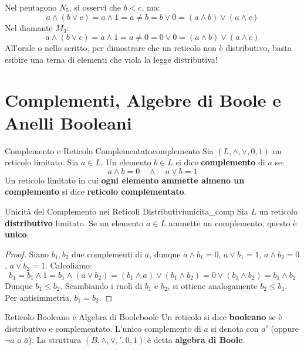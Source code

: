 \begin{avvisoCutolo}
    Nel pentagono $N_5$, si osservi che $b < c$, ma:
    \[
        a \wedge (b \vee c) = a \wedge 1 = a \neq b = b \vee 0 = (a \wedge b) \vee (a \wedge c)
    \]
    Nel diamante $M_3$:
    \[
        a \wedge (b \vee c) = a \wedge 1 = a \neq 0 = 0 \vee 0 = (a \wedge b) \vee (a \wedge c)
    \]
    All'orale o nello scritto, per dimostrare che un reticolo non è distributivo, basta esibire una terna di elementi che viola la legge distributiva!
\end{avvisoCutolo}

\section{Complementi, Algebre di Boole e Anelli Booleani}

\begin{definizione}{Complemento e Reticolo Complementato}{complemento}
Sia $(L, \wedge, \vee, 0, 1)$ un reticolo limitato. Sia $a \in L$. Un elemento $b \in L$ si dice \textbf{complemento} di $a$ se:
\[
    a \wedge b = 0 \quad \wedge \quad a \vee b = 1
\]
Un reticolo limitato in cui \textbf{ogni elemento ammette almeno un complemento} si dice \textbf{reticolo complementato}.
\end{definizione}

\begin{teorema}{Unicità del Complemento nei Reticoli Distributivi}{unicita_comp}
Sia $L$ un reticolo \textbf{distributivo} limitato. Se un elemento $a \in L$ ammette un complemento, questo è \textbf{unico}.
\end{teorema}
\begin{proof}
Siano $b_1, b_2$ due complementi di $a$, dunque $a \wedge b_1 = 0$, $a \vee b_1 = 1$, $a \wedge b_2 = 0$, $a \vee b_2 = 1$.
Calcoliamo:
\[
    b_1 = b_1 \wedge 1 = b_1 \wedge (a \vee b_2) = (b_1 \wedge a) \vee (b_1 \wedge b_2) = 0 \vee (b_1 \wedge b_2) = b_1 \wedge b_2
\]
Dunque $b_1 \le b_2$. Scambiando i ruoli di $b_1$ e $b_2$, si ottiene analogamente $b_2 \le b_1$. Per antisimmetria, $b_1 = b_2$.
\end{proof}

\begin{definizione}{Reticolo Booleano e Algebra di Boole}{boole}
Un reticolo si dice \textbf{booleano} se è distributivo e complementato.
L'unico complemento di $a$ si denota con $a'$ (oppure $\neg a$ o $\bar{a}$).
La struttura $(B, \wedge, \vee, ', 0, 1)$ è detta \textbf{algebra di Boole}.
\end{definizione}


